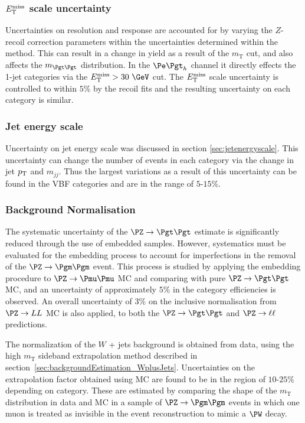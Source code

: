 \subsubsection{\textbf{$E_{\mathrm{T}}^{\text{miss}}$ scale uncertainty}}
Uncertainties on \MET resolution and response are accounted for
by varying the $Z$-recoil correction parameters within the uncertainties determined within the method.
This can result in a change in yield as a result of the $m_{\text{T}}$ cut, and
also affects the $m_{\Pgt\Pgt}$ distribution. In the $\etau$ channel it directly
effects the 1-jet categories via the $\MET > 30~\GeV$ cut. The $E_{\mathrm{T}}^{\text{miss}}$ scale
uncertainty is controlled to within $5\%$ by the recoil fits and the resulting
uncertainty on each category is similar. 

\subsubsection{\textbf{Jet energy scale}}
Uncertainty on jet energy scale was discussed in section
\ref{sec:jetenergyscale}. This uncertainty can change the number of events in
each category via the change in jet $p_{\mathrm{T}}$ and $m_{jj}$. Thus the largest
variations as a result of this uncertainty can be found in the VBF categories
and are in the range of $5$-$15\%$. 

\subsubsection{\textbf{Background Normalisation}}
The systematic uncertainty of the $\ZToTauTau$ estimate is significantly reduced
through the use of embedded samples. However, systematics must be evaluated for
the embedding process to account for imperfections in the removal of the
$\PZ\to\Pgm\Pgm$ event. This process is studied by applying the embedding
procedure to $\PZ\to\Pmu\Pmu$ \ac{MC} and comparing with pure $\ZToTauTau$
\ac{MC}, and an uncertainty of approximately $5\%$ in the category efficiencies
is observed. An overall uncertainty of $3\%$ on the inclusive normalisation from
$\PZ\to LL$ \ac{MC} is also applied, to both the $\ZToTauTau$ and
$\PZ\to\ell\ell$ predictions.

The normalization of the $W$ + jets background is obtained from data, 
using the high $m_{\text{T}}$ sideband extrapolation method described in
section~\ref{sec:backgroundEstimation_WplusJets}. Uncertainties on the
extrapolation factor obtained using \ac{MC} are found to be in the region of
$10$-$25\%$ depending on category. These are estimated by comparing the shape of
the $m_{\text{T}}$ distribution in data and \ac{MC} in a sample of
$\PZ\to\Pgm\Pgm$ events in which one muon is treated as invisible in the event
reconstruction to mimic a $\PW$ decay. 

